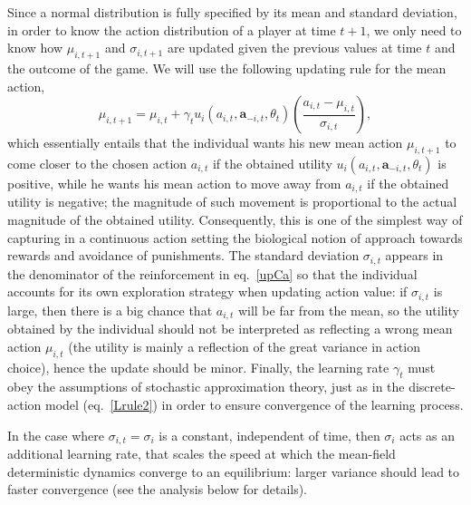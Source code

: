 \documentclass[11pt,reqno]{amsart}
\newcommand{\e}{\theta}
\newcommand{\ac}{a}
\newcommand{\va}{\mathbf{a}}
\newcommand{\lr}{\gamma}
\newcommand{\tm}{t}%
\newcommand{\pf}{u}
\newcommand{\ma}{\mu}
\newcommand{\sd}{\sigma}
\begin{document}
Since a normal distribution is fully specified by its mean and standard deviation, in order to know the action distribution of a player at time $\tm+1$, we only need to know how $\ma_{i,\tm+1}$ and $\sd_{i,\tm+1}$ are updated given the previous values at time $\tm$ and the outcome of the game. We will use the following updating rule for the mean action,
\begin{equation}
\label{upCa}
\ma_{i,\tm+1} = \ma_{i,\tm} + \lr_\tm \pf_{i}(\ac_{i,\tm},\va_{-i,\tm},\e_\tm) \left( \frac{\ac_{i,\tm}- \ma_{i,\tm}}{\sd_{i,\tm}} \right),
\end{equation}
which essentially entails that the individual wants his new mean action $\ma_{i,\tm+1}$ to come closer to the chosen action $\ac_{i,\tm}$ if the obtained utility $\pf_{i}(\ac_{i,\tm},\va_{-i,\tm},\e_\tm)$ is positive, while he wants his mean action to move away from $\ac_{i,\tm}$ if the obtained utility is negative; the magnitude of such movement is proportional to the actual magnitude of the obtained utility. Consequently, this is one of the simplest way of capturing in a continuous action setting the biological notion of approach towards rewards and avoidance of punishments. %
The standard deviation $\sd_{i,\tm}$ appears in the denominator of the reinforcement in eq.~\ref{upCa} so that the individual accounts for its own exploration strategy when updating action value: if $\sd_{i,\tm}$ is large, then there is a big chance that $\ac_{i,\tm}$ will be far from the mean, so the utility obtained by the individual should not be interpreted as reflecting a wrong mean action $\ma_{i,\tm}$ (the utility is mainly a reflection of the great variance in action choice), hence the update should be minor. Finally, the learning rate $\lr_\tm$ must obey the assumptions of stochastic approximation theory, just as in the discrete-action model (eq.~\ref{Lrule2}) in order to ensure convergence of the learning process.

In the case where $\sd_{i,\tm} = \sd_{i}$ is a constant, independent of time, then  $\sd_{i}$ acts as an additional learning rate, that scales the speed at which the mean-field deterministic dynamics converge to an equilibrium: larger variance should lead to faster convergence (see the analysis below for details).
\end{document}
